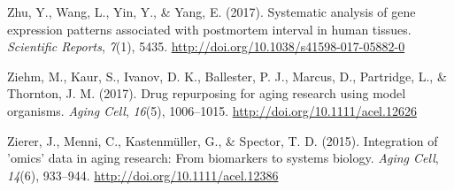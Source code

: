 \documentclass[12pt,twoside]{unicam}
\begin{document}
\begin{cslreferences}
\leavevmode\hypertarget{ref-Zhu2017}{}%
Zhu, Y., Wang, L., Yin, Y., \& Yang, E. (2017). Systematic analysis of gene expression patterns associated with postmortem interval in human tissues. \emph{Scientific Reports}, \emph{7}(1), 5435. \url{http://doi.org/10.1038/s41598-017-05882-0}

\leavevmode\hypertarget{ref-Ziehm2017}{}%
Ziehm, M., Kaur, S., Ivanov, D. K., Ballester, P. J., Marcus, D., Partridge, L., \& Thornton, J. M. (2017). Drug repurposing for aging research using model organisms. \emph{Aging Cell}, \emph{16}(5), 1006--1015. \url{http://doi.org/10.1111/acel.12626}

\leavevmode\hypertarget{ref-Zierer2015}{}%
Zierer, J., Menni, C., Kastenmüller, G., \& Spector, T. D. (2015). Integration of 'omics' data in aging research: From biomarkers to systems biology. \emph{Aging Cell}, \emph{14}(6), 933--944. \url{http://doi.org/10.1111/acel.12386}
\end{cslreferences}
\end{document}
